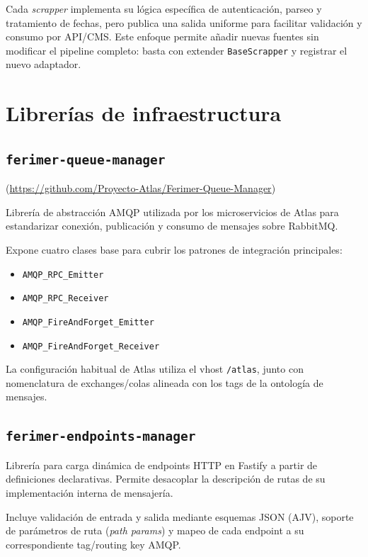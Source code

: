 Cada \textit{scrapper} implementa su lógica específica de autenticación, parseo y tratamiento de fechas, pero publica una salida uniforme para facilitar validación y consumo por API/CMS. Este enfoque permite añadir nuevas fuentes sin modificar el pipeline completo: basta con extender \texttt{BaseScrapper} y registrar el nuevo adaptador.

\section{Librerías de infraestructura}

\subsection{\texttt{ferimer-queue-manager}}\label{sec:ferimer-queue-manager}

(\url{https://github.com/Proyecto-Atlas/Ferimer-Queue-Manager})

Librería de abstracción AMQP utilizada por los microservicios de Atlas para estandarizar conexión, publicación y consumo de mensajes sobre RabbitMQ.

Expone cuatro clases base para cubrir los patrones de integración principales:

\begin{itemize}
\item \texttt{AMQP\_RPC\_Emitter}
\item \texttt{AMQP\_RPC\_Receiver}
\item \texttt{AMQP\_FireAndForget\_Emitter}
\item \texttt{AMQP\_FireAndForget\_Receiver}
\end{itemize}

La configuración habitual de Atlas utiliza el vhost \texttt{/atlas}, junto con nomenclatura de exchanges/colas alineada con los tags de la ontología de mensajes.

\subsection{\texttt{ferimer-endpoints-manager}}\label{sec:ferimer-endpoints-manager}

Librería para carga dinámica de endpoints HTTP en Fastify a partir de definiciones declarativas. Permite desacoplar la descripción de rutas de su implementación interna de mensajería.

Incluye validación de entrada y salida mediante esquemas JSON (AJV), soporte de parámetros de ruta (\textit{path params}) y mapeo de cada endpoint a su correspondiente tag/routing key AMQP.

